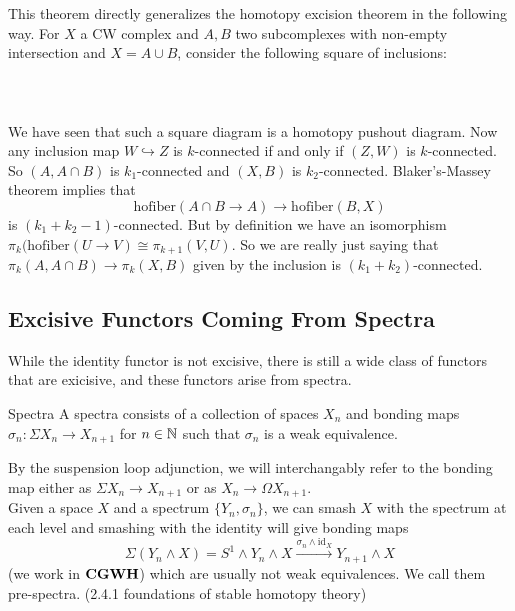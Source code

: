 \documentclass[a4paper]{article}
\begin{document}
This theorem directly generalizes the homotopy excision theorem in the following way. For $X$ a CW complex and $A,B$ two subcomplexes with non-empty intersection and $X=A\cup B$, consider the following square of inclusions: \\~\\
\\~\\
We have seen that such a square diagram is a homotopy pushout diagram. Now any inclusion map $W\hookrightarrow Z$ is $k$-connected if and only if $(Z,W)$ is $k$-connected. So $(A,A\cap B)$ is $k_1$-connected and $(X,B)$ is $k_2$-connected. Blaker's-Massey theorem implies that $$\text{hofiber}(A\cap B\to A)\to\text{hofiber}(B,X)$$ is $(k_1+k_2-1)$-connected. But by definition we have an isomorphism $\pi_k(\text{hofiber}(U\to V)\cong\pi_{k+1}(V,U)$. So we are really just saying that $\pi_k(A,A\cap B)\to\pi_k(X,B)$ given by the inclusion is $(k_1+k_2)$-connected. 

\subsection{Excisive Functors Coming From Spectra}
While the identity functor is not excisive, there is still a wide class of functors that are exicisive, and these functors arise from spectra. 

\begin{defn}{Spectra}{} A spectra consists of a collection of spaces $X_n$ and bonding maps $\sigma_n:\Sigma X_n\to X_{n+1}$ for $n\in\mathbb{N}$ such that $\sigma_n$ is a weak equivalence. 
\end{defn}

By the suspension loop adjunction, we will interchangably refer to the bonding map either as $\Sigma X_n\to X_{n+1}$ or as $X_n\to\Omega X_{n+1}$. \\

Given a space $X$ and a spectrum $\{Y_n,\sigma_n\}$, we can smash $X$ with the spectrum at each level and smashing with the identity will give bonding maps $$\Sigma(Y_n\wedge X)=S^1\wedge Y_n\wedge X\overset{\sigma_n\wedge\text{id}_X}{\to} Y_{n+1}\wedge X$$ (we work in $\bold{CGWH}$) which are usually not weak equivalences. We call them pre-spectra. (2.4.1 foundations of stable homotopy theory)
\end{document}
